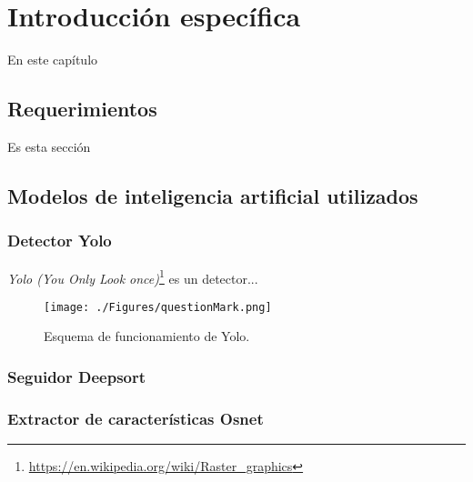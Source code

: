 \chapter{Introducción específica} %

\label{Chapter2}

En este capítulo


\section{Requerimientos}
\label{sec:requerimientos}

Es esta sección


\section{Modelos de inteligencia artificial utilizados}
\label{sec:requerimientos}

\subsection{Detector Yolo}

\textit{Yolo (You Only Look once)}\footnote{\url{https://en.wikipedia.org/wiki/Raster_graphics}} es un detector...


\begin{figure}[ht]
	\centering
	\texttt{[image: ./Figures/questionMark.png]}
	\caption{Esquema de funcionamiento de Yolo.}
	\label{fig:diagramaYolo}
\end{figure}



\subsection{Seguidor Deepsort}

\subsection{Extractor de características Osnet}
\label{sec:exactorOsnet}

